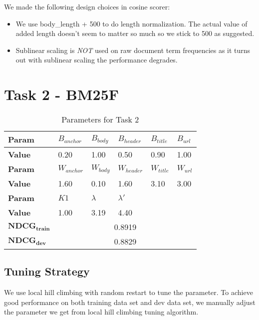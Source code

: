 \documentclass{article}
\begin{document}
We made the following design choices in cosine scorer:

\begin{itemize}
    \item We use body\_length + 500 to do length normalization. The actual value of added length doesn't seem to matter so much so we stick to 500 as suggested.
    \item Sublinear scaling is \emph{NOT} used on raw document term frequencies as it turns out with sublinear scaling the performance degrades.
\end{itemize}

\section{Task 2 - BM25F}

\begin{table}[!htb]
  \centering
  \begin{tabular}{ | l | l | l | l | l | l |}
    \hline
    \textbf{Param} & $B_{anchor}$ & $B_{body}$ & $B_{header}$ & $B_{title}$ & $B_{url}$ \\
    \hline
    \textbf{Value} & 0.20 & 1.00 & 0.50 & 0.90 & 1.00 \\
    \hline
    \textbf{Param} & $W_{anchor}$ & $W_{body}$ & $W_{header}$ & $W_{title}$ & $W_{url}$ \\
    \hline
    \textbf{Value} & 1.60 & 0.10 & 1.60 & 3.10 & 3.00 \\
    \hline
    \textbf{Param} & $K1$ & $\lambda$ & $\lambda'$ & \multicolumn{2}{c|}{} \\
    \hline
    \textbf{Value} & 1.00 & 3.19 & 4.40 & \multicolumn{2}{c|}{}\\
    \hline
    $\mathbf{NDCG_{train}}$ & \multicolumn{5}{c|}{0.8919} \\
    \hline
    $\mathbf{NDCG_{dev}}$ & \multicolumn{5}{c|}{0.8829} \\
    \hline
  \end{tabular}
  \caption{Parameters for Task 2}
\end{table}

\subsection{Tuning Strategy}

We use local hill climbing with random restart to tune the parameter. To achieve good performance on both training data set and dev data set, we manually adjust the parameter we get from local hill climbing tuning algorithm.
\end{document}
